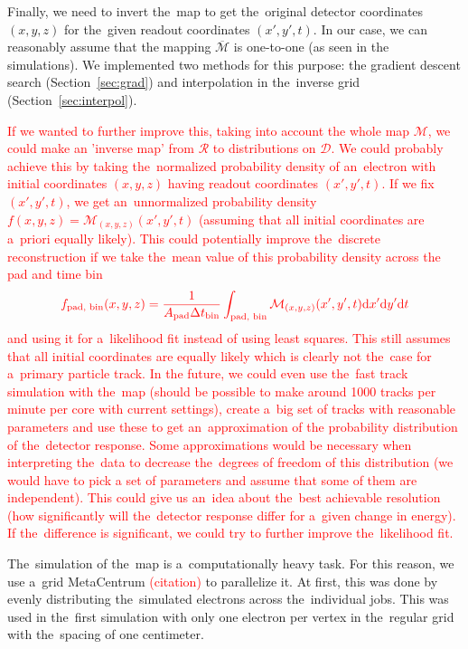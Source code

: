 		Finally, we need to invert the~map to get the~original detector coordinates $(x,y,z)$ for the~given readout coordinates $(x',y',t)$. In our case, we can reasonably assume that the mapping $\overbar{\mathcal{M}}$ is one-to-one (as seen in the simulations). We implemented two methods for this purpose: the gradient descent search (Section~\ref{sec:grad}) and interpolation in the~inverse grid (Section~\ref{sec:interpol}).
		
		\textcolor{red}{If we wanted to further improve this, taking into account the whole map $\mathcal{M}$, we could make an 'inverse map' from $\mathcal{R}$ to distributions on $\mathcal{D}$. We could probably achieve this by taking the~normalized probability density of an~electron with initial coordinates $(x,y,z)$ having readout coordinates $(x',y',t)$. If we fix $(x',y',t)$, we get an~unnormalized probability density $f(x,y,z) = \mathcal{M}_{(x,y,z)}(x',y',t)$ (assuming that all initial coordinates are a~priori equally likely). This could potentially improve the~discrete reconstruction if we take the~mean value of this probability density across the pad and time bin}
			\begin{equation}
				\color{red}
				f_\text{pad, bin}(x,y,z) = \frac{1}{A_\text{pad} \Delta t_\text{bin}} \int_\text{pad, bin} \mathcal{M}_{(x,y,z)}(x',y',t) \text{d}x'\text{d}y'\text{d}t
			\end{equation}
		\textcolor{red}{and using it for a~likelihood fit instead of using least squares. This still assumes that all initial coordinates are equally likely which is clearly not the~case for a~primary particle track. In the future, we could even use the~fast track simulation with the~map (should be possible to make around 1000 tracks per minute per core with current settings), create a~big set of tracks with reasonable parameters and use these to get an~approximation of the probability distribution of the~detector response. Some approximations would be necessary when interpreting the~data to decrease the~degrees of freedom of this distribution (we would have to pick a set of parameters and assume that some of them are independent). This could give us an~idea about the~best achievable resolution (how significantly will the~detector response differ for a~given change in energy). If the~difference is significant, we could try to further improve the~likelihood fit.}
		
		The~simulation of the~map is a~computationally heavy task. For this reason, we use a~grid MetaCentrum \textcolor{red}{(citation)} to parallelize it. At first, this was done by evenly distributing the~simulated electrons across the~individual jobs. This was used in the~first simulation with only one electron per vertex in the~regular grid with the~spacing of one centimeter. 
		
